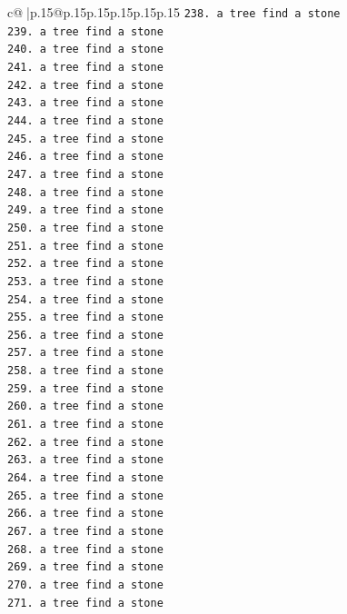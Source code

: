 \documentclass{article}
\begin{document}
{\begin{supertabular}{c@{$\;$}|p{.15\linewidth}@{}p{.15\linewidth}p{.15\linewidth}p{.15\linewidth}p{.15\linewidth}p{.15\linewidth}}
{{{\texttt{238. a tree find a stone} \\
\texttt{239. a tree find a stone} \\
\texttt{240. a tree find a stone} \\
\texttt{241. a tree find a stone} \\
\texttt{242. a tree find a stone} \\
\texttt{243. a tree find a stone} \\
\texttt{244. a tree find a stone} \\
\texttt{245. a tree find a stone} \\
\texttt{246. a tree find a stone} \\
\texttt{247. a tree find a stone} \\
\texttt{248. a tree find a stone} \\
\texttt{249. a tree find a stone} \\
\texttt{250. a tree find a stone} \\
\texttt{251. a tree find a stone} \\
\texttt{252. a tree find a stone} \\
\texttt{253. a tree find a stone} \\
\texttt{254. a tree find a stone} \\
\texttt{255. a tree find a stone} \\
\texttt{256. a tree find a stone} \\
\texttt{257. a tree find a stone} \\
\texttt{258. a tree find a stone} \\
\texttt{259. a tree find a stone} \\
\texttt{260. a tree find a stone} \\
\texttt{261. a tree find a stone} \\
\texttt{262. a tree find a stone} \\
\texttt{263. a tree find a stone} \\
\texttt{264. a tree find a stone} \\
\texttt{265. a tree find a stone} \\
\texttt{266. a tree find a stone} \\
\texttt{267. a tree find a stone} \\
\texttt{268. a tree find a stone} \\
\texttt{269. a tree find a stone} \\
\texttt{270. a tree find a stone} \\
\texttt{271. a tree find a stone} \\
}}}
\end{supertabular}}
\end{document}
